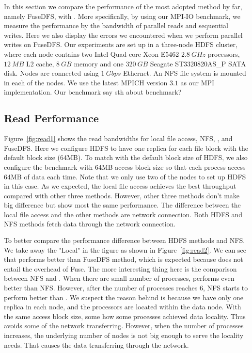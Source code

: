 In this section we compare the performance of the most adopted method by far,
namely FuseDFS, with {\proj}. More specifically, by using our MPI-IO benchmark,
we measure the performance by the bandwidth of parallel reads and sequential
writes. Here we also display the errors we encountered when we perform parallel
writes on FuseDFS. Our experiments are set up in a three-node HDFS cluster,
where each node contains two Intel Quad-core Xeon E5462 $2.8~GHz$ processors,
$12~MB$ L2 cache, $8~GB$ memory and one $320~GB$ Seagate ST3320820AS\_P SATA
disk. Nodes are connected using $1~Gbps$ Ethernet. An NFS file system is mounted
in each of the nodes. We use the latest MPICH
version $3.1$ as our MPI implementation. Our benchmark {\color{red} say sth
about benchmark?}

\subsection{Read Performance}
Figure~\ref{fig:read1} shows the read bandwidths for local file access, NFS, {\proj},
and FuseDFS. Here we configure HDFS to have one replica for each file block with
the default block size (64MB). To match with the default block size of HDFS, we
also configure the benchmark with 64MB access block size so that each process
access 64MB of data each time. Note that we only use two of the nodes to set up
HDFS in this case. As we expected, the local file access achieves
the best throughput compared with other three methods. However, other three
methods don't make big difference but show most the same performance. The
difference between the local file access and the other methods are network
connection. Both HDFS and NFS methods fetch data through the network connection.

To better compare the performance difference between HDFS methods and NFS. We
take away the "Local" in the figure as shown in Figure~\ref{fig:read2}. We 
can see that {\proj} performs better than FuseDFS method, which is expected
because {\proj} does not entail the overhead of Fuse. The more interesting thing
here is the comparison between NFS and {\proj}. When there are small
number of processes, {\proj} performs even better than NFS. However, after the
number of processes reaches 6, NFS starts to perform better than {\proj}. We
suspect the reason behind is because we have only one replica in each node, and
the processors are located within the data node. With the same access block
size, some how some processes achieved data locality. Thus avoids some of the
network transferring. However, when the number of processes increases, the
underlying number of nodes is not big enough to serve the locality needs. That
causes the data transferring through the network.

